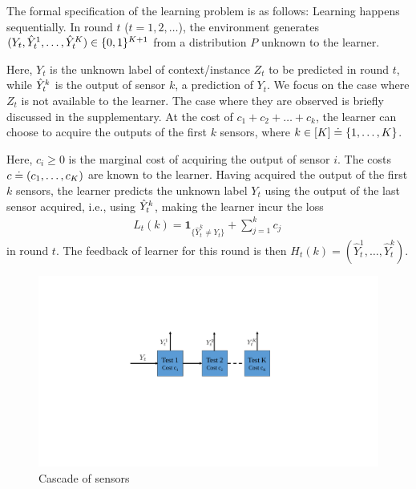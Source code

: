 The formal specification of the learning problem is as follows:
Learning happens sequentially.
In round $t$ ($t=1,2,\dots$), 
the environment generates 
$(Y_t,\hat{Y}_t^1,\dots,\hat{Y}_t^K)\in \{0,1\}^{K+1}$ from a distribution $P$ unknown to the learner.

Here, $Y_t$ is the unknown label of context/instance $Z_t$ to be predicted in round $t$, while $\hat{Y}_t^k$ is the output of sensor
$k$, a prediction of $Y_t$. We focus on the case where $Z_t$ is not available to the learner. The case where they are observed is briefly discussed in the supplementary. 
At the cost of $c_1+ c_2 + \dots + c_k$,
the learner can choose to acquire the outputs of the first $k$ sensors,
where $k\in [K] \doteq \{1,\dots,K\}$. 

Here, $c_i\ge 0$ is the marginal cost of acquiring the output of sensor $i$.
The costs $c \doteq (c_1,\dots,c_K)$ are known to the learner.
Having acquired the output of the first $k$ sensors, the learner predicts the unknown label $Y_t$ using
the output of the last sensor acquired, i.e., using $\hat{Y}_t^k$, making the learner incur the loss
\begin{align*}
L_t(k)=\mathbf{1}_{\{\hat{Y}^k_t\neq Y_t\}}+\sum_{j=1}^k c_j\,
\end{align*}
in round $t$.
The feedback of learner for this round is then $H_t(k)=(\hat{Y}^1_t,\ldots,\hat{Y}^k_t)$.



\begin{figure}
	\vspace{-.5cm}
	\centering
	\includegraphics[scale=.6]{../Figures/cascade.pdf}
	\caption{Cascade of sensors
	}\label{wrap-fig:1}
	\vspace{-.5cm}
\end{figure} 

